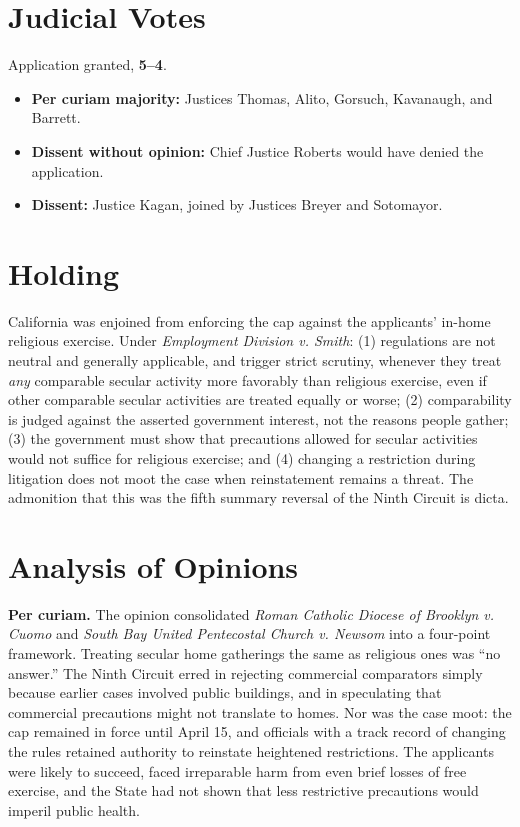 \documentclass[12pt]{article}
\begin{document}
\section{Judicial Votes}

Application granted, \textbf{5--4}.
\begin{itemize}
\item \textbf{Per curiam majority:} Justices Thomas, Alito, Gorsuch, Kavanaugh, and Barrett.
\item \textbf{Dissent without opinion:} Chief Justice Roberts would have denied the application.
\item \textbf{Dissent:} Justice Kagan, joined by Justices Breyer and Sotomayor.
\end{itemize}

\section{Holding}

California was enjoined from enforcing the cap against the applicants' in-home religious exercise. Under \textit{Employment Division v. Smith}: (1) regulations are not neutral and generally applicable, and trigger strict scrutiny, whenever they treat \textit{any} comparable secular activity more favorably than religious exercise, even if other comparable secular activities are treated equally or worse; (2) comparability is judged against the asserted government interest, not the reasons people gather; (3) the government must show that precautions allowed for secular activities would not suffice for religious exercise; and (4) changing a restriction during litigation does not moot the case when reinstatement remains a threat. The admonition that this was the fifth summary reversal of the Ninth Circuit is dicta.

\section{Analysis of Opinions}

\textbf{Per curiam.} The opinion consolidated \textit{Roman Catholic Diocese of Brooklyn v. Cuomo} and \textit{South Bay United Pentecostal Church v. Newsom} into a four-point framework. Treating secular home gatherings the same as religious ones was ``no answer.'' The Ninth Circuit erred in rejecting commercial comparators simply because earlier cases involved public buildings, and in speculating that commercial precautions might not translate to homes. Nor was the case moot: the cap remained in force until April 15, and officials with a track record of changing the rules retained authority to reinstate heightened restrictions. The applicants were likely to succeed, faced irreparable harm from even brief losses of free exercise, and the State had not shown that less restrictive precautions would imperil public health.
\end{document}
